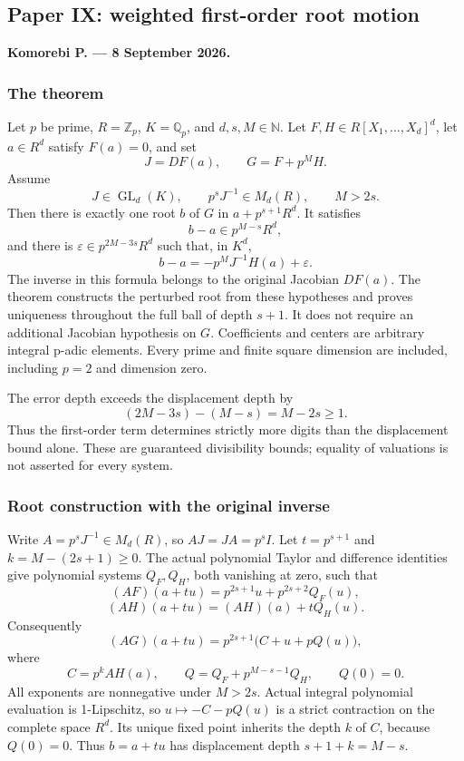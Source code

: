 \hypertarget{cont7:paper-ix-weighted-first-order-root-motion}{%
\subsection{Paper IX: weighted first-order root
motion}\label{cont7:paper-ix-weighted-first-order-root-motion}}

\textbf{Komorebi P. --- 8 September 2026.}

\hypertarget{cont7:the-theorem}{%
\subsubsection{The theorem}\label{cont7:the-theorem}}

Let \(p\) be prime, \(R=\mathbb Z_p\), \(K=\mathbb Q_p\), and
\(d,s,M\in\mathbb N\). Let \(F,H\in R[X_1,\ldots,X_d]^d\), let
\(a\in R^d\) satisfy \(F(a)=0\), and set \[
J=DF(a),\qquad G=F+p^M H.
\] Assume \[
J\in\operatorname{GL}_d(K),\qquad p^sJ^{-1}\in M_d(R),\qquad M>2s.
\] Then there is exactly one root \(b\) of \(G\) in \(a+p^{s+1}R^d\). It
satisfies \[
b-a\in p^{M-s}R^d,
\] and there is \(\varepsilon\in p^{2M-3s}R^d\) such that, in \(K^d\),
\[
\boxed{b-a=-p^M J^{-1}H(a)+\varepsilon.}
\] The inverse in this formula belongs to the original Jacobian
\(DF(a)\). The theorem constructs the perturbed root from these
hypotheses and proves uniqueness throughout the full ball of depth
\(s+1\). It does not require an additional Jacobian hypothesis on \(G\).
Coefficients and centers are arbitrary integral p-adic elements. Every
prime and finite square dimension are included, including \(p=2\) and
dimension zero.

The error depth exceeds the displacement depth by \[
(2M-3s)-(M-s)=M-2s\ge1.
\] Thus the first-order term determines strictly more digits than the
displacement bound alone. These are guaranteed divisibility bounds;
equality of valuations is not asserted for every system.

\hypertarget{cont7:root-construction-with-the-original-inverse}{%
\subsubsection{Root construction with the original
inverse}\label{cont7:root-construction-with-the-original-inverse}}

Write \(A=p^sJ^{-1}\in M_d(R)\), so \(AJ=JA=p^sI\). Let \(t=p^{s+1}\)
and \(k=M-(2s+1)\ge0\). The actual polynomial Taylor and difference
identities give polynomial systems \(Q_F,Q_H\), both vanishing at zero,
such that \[
(AF)(a+tu)=p^{2s+1}u+p^{2s+2}Q_F(u),
\] \[
(AH)(a+tu)=(AH)(a)+tQ_H(u).
\] Consequently \[
(AG)(a+tu)=p^{2s+1}\bigl(C+u+pQ(u)\bigr),
\] where \[
C=p^kAH(a),\qquad
Q=Q_F+p^{M-s-1}Q_H,\qquad Q(0)=0.
\] All exponents are nonnegative under \(M>2s\). Actual integral
polynomial evaluation is 1-Lipschitz, so \(u\mapsto-C-pQ(u)\) is a
strict contraction on the complete space \(R^d\). Its unique fixed point
inherits the depth \(k\) of \(C\), because \(Q(0)=0\). Thus \(b=a+tu\)
has displacement depth \(s+1+k=M-s\).

